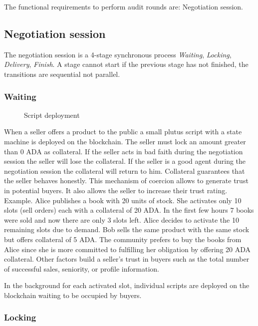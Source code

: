 \documentclass[12pt]{article}
\begin{document}
The functional requirements to perform audit rounds are: Negotiation session.

\subsection { Negotiation session }

The negotiation session is a 4-stage synchronous process \emph{Waiting}, \emph{Locking}, \emph{Delivery}, \emph{Finish}. A stage cannot start if the previous stage has not finished, the transitions are sequential not parallel.

\subsubsection { Waiting }

\begin{figure}[ht]
  \centering
  
  \caption{Script deployment}
  \label{fig:mi_imagen}
\end{figure}


When a seller offers a product to the public a small plutus script with a state machine is deployed on the blockchain.
The seller must lock an amount greater than 0 ADA as collateral. 
If the seller acts in bad faith during the negotiation session the seller will lose the collateral.
If the seller is a good agent during the negotiation session the collateral will return to him.
Collateral guarantees that the seller behaves honestly.
This mechanism of coercion allows to generate trust in potential buyers. 
It also allows the seller to increase their trust rating. Example. Alice publishes a book with 20 units of stock.
She activates only 10 slots (sell orders) each with a collateral of 20 ADA.
In the first few hours 7 books were sold and now there are only 3 slots left.
Alice decides to activate the 10 remaining slots due to demand.
Bob sells the same product with the same stock but offers collateral of 5 ADA. The community prefers to buy the books from Alice since she is more committed to fulfilling her obligation by offering 20 ADA collateral. Other factors build a seller's trust in buyers such as the total number of successful sales, seniority, or profile information.

In the background for each activated slot, individual scripts are deployed on the blockchain waiting to be occupied by buyers.

\subsubsection { Locking }
\end{document}
